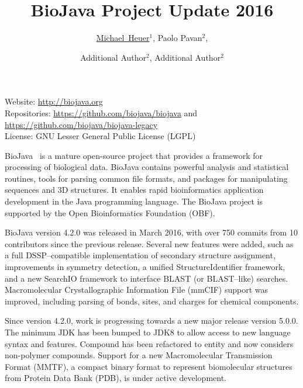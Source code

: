 \documentclass[10pt,oneside]{article}
\title{BioJava Project Update 2016}
\author{\small \underline{Michael~Heuer}$^{1}$, Paolo Pavan$^{2}$,
\and \small Additional Author$^{2}$, Additional Author${^2}$}
\date{}
\begin{document}

\renewcommand{\thefootnote}{\fnsymbol{footnote}}


\maketitle

\vspace{-0.25in}
\noindent
{\small
Website: \url{http://biojava.org} \\
Repositories: \url{https://github.com/biojava/biojava} and \url{https://github.com/biojava/biojava-legacy}\\
License: GNU Lesser General Public License (LGPL)\\
}

BioJava~\cite{prlic2012biojava} is a mature open-source project that provides a framework for processing of
biological data. BioJava contains powerful analysis and statistical routines, tools for parsing common file
formats, and packages for manipulating sequences and 3D structures. It enables rapid bioinformatics application
development in the Java programming language. The BioJava project is supported by the Open Bioinformatics
Foundation (OBF).


BioJava version 4.2.0 was released in March 2016, with over 750 commits from 10 contributors since the
previous release.  Several new features were added, such as a full DSSP--compatible implementation of secondary
structure assignment, improvements in symmetry detection, a unified StructureIdentifier framework, and a
new SearchIO framework to interface {BLAST} (or {BLAST}--like) searches.  Macromolecular Crystallographic
Information File ({mmCIF}) support was improved, including parsing of bonds, sites, and charges for
chemical components.


Since version 4.2.0, work is progressing towards a new major release version 5.0.0.  The minimum JDK has been
bumped to JDK8 to allow access to new language syntax and features.  Compound has been refactored to entity
and now considers non-polymer compounds.  Support for a new Macromolecular Transmission Format ({MMTF}), a compact
binary format to represent biomolecular structures from Protein Data Bank ({PDB}), is under active development.



\end{document}
